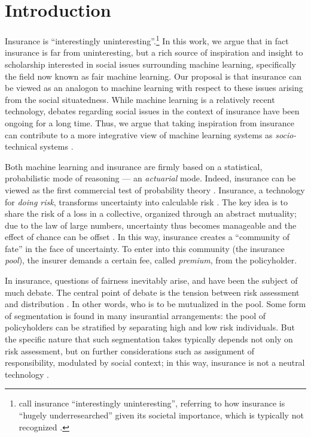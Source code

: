 \documentclass[11pt]{article} %
\begin{document}
\section{Introduction}
Insurance is ``interestingly uninteresting''.\footnote{\citet{mcfall2020personalisation} call insurance ``interestingly uninteresting'', referring to how insurance is ``hugely underresearched'' given its societal importance, which is typically not recognized \citep{ewald1989versicherungs}.} 
In this work, we argue that in fact insurance is far from uninteresting, but a rich source of inspiration and insight to scholarship interested in social issues surrounding machine learning, specifically the field now known as fair machine learning. Our proposal is that insurance can be viewed as an analogon to machine learning with respect to these issues arising from the social situatedness. While machine learning is a relatively recent technology, debates regarding social issues in the context of insurance have been ongoing for a long time. Thus, we argue that taking inspiration from insurance can contribute to a more integrative view of machine learning systems as \textit{socio-}technical systems \citep{sociotechnical}. 

Both machine learning and insurance are firmly based on a statistical, probabilistic mode of reasoning --- an \textit{actuarial} mode. Indeed, insurance can be viewed as the first commercial test of probability theory \citep{gigerenzer1989empire,mcfall2011good}. Insurance, a technology for \textit{doing risk}, transforms uncertainty into calculable risk \citep{lehtonen2014editorial}. The key idea is to share the risk of a loss in a collective, organized through an abstract mutuality; due to the law of large numbers, uncertainty thus becomes manageable and the effect of chance can be offset \citep{ewald1991insurance}. In this way, insurance creates a ``community of fate'' \citep{heimer1985reactive} in the face of uncertainty. To enter into this community (the insurance \textit{pool}), the insurer demands a certain fee, called \textit{premium}, from the policyholder.

In insurance, questions of fairness inevitably arise, and have been the subject of much debate. The central point of debate is the tension between risk assessment and distribution \citep{abraham1985efficiency}. In other words, who is to be mutualized in the pool. Some form of segmentation is found in many insurantial arrangements: the pool of policyholders can be stratified by separating high and low risk individuals. But the specific nature that such segmentation takes typically depends not only on risk assessment, but on further considerations such as assignment of responsibility, modulated by social context; in this way, insurance is not a neutral technology \citep{baker2002embracing,glenn2003postmodernism}. 
\end{document}
